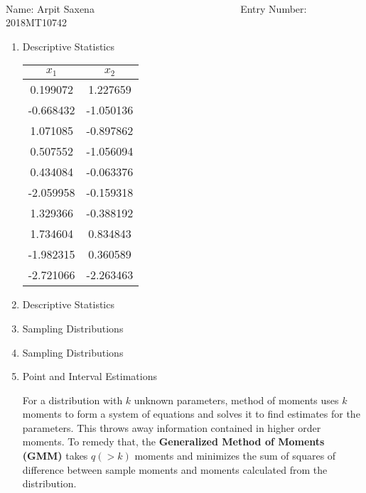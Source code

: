 \documentclass[12pt, oneside]{article}
\begin{document}
\setlength{\textheight}{8.5in}
\\





\vskip 0.5cm

\noindent Name: Arpit Saxena ~  ~~~~~ ~~~~ ~~~~~~~~~~~~~~~~ Entry Number: 2018MT10742 ~~~~~~~~~~~~~



\vskip 0.5cm



\begin{enumerate}

\item	{
    Descriptive Statistics

    \begin{tabular}{cc}
    \toprule
      \(x_1\) &   \(x_2\) \\
    \midrule
     0.199072 &  1.227659 \\
    -0.668432 & -1.050136 \\
     1.071085 & -0.897862 \\
     0.507552 & -1.056094 \\
     0.434084 & -0.063376 \\
    -2.059958 & -0.159318 \\
     1.329366 & -0.388192 \\
     1.734604 &  0.834843 \\
    -1.982315 &  0.360589 \\
    -2.721066 & -2.263463 \\
    \bottomrule
    \end{tabular}
        
}


\item	Descriptive Statistics


\item	Sampling Distributions



\item	Sampling Distributions 


\item	{
  Point and Interval Estimations

  For a distribution with \(k\) unknown parameters, method of moments uses \(k\) moments
  to form a system of equations and solves it to find estimates for the parameters.
  This throws away information contained in higher order moments. To remedy that, the
  \textbf{Generalized Method of Moments (GMM)} takes \(q (> k)\) moments and minimizes
  the sum of squares of difference between sample moments and moments calculated from
  the distribution.

}
\end{enumerate}
\end{document}
